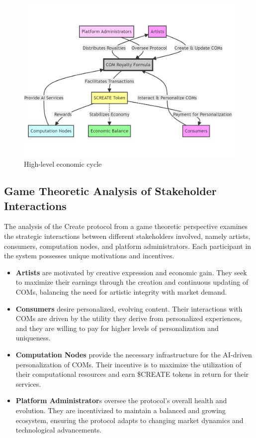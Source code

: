 \documentclass[12pt,a4paper]{article}
\begin{document}
\begin{figure}
    \centering
    \includegraphics[width=0.8\linewidth]{create_3.png}
    \caption{High-level economic cycle}
    \label{fig:economic-cycle}
\end{figure}

\subsection{Game Theoretic Analysis of Stakeholder Interactions}

The analysis of the Create protocol from a game theoretic perspective examines the strategic interactions between different stakeholders involved, namely artists, consumers, computation nodes, and platform administrators. Each participant in the system possesses unique motivations and incentives.

\begin{itemize}
    \item \textbf{Artists} are motivated by creative expression and economic gain. They seek to maximize their earnings through the creation and continuous updating of COMs, balancing the need for artistic integrity with market demand.
    \item \textbf{Consumers} desire personalized, evolving content. Their interactions with COMs are driven by the utility they derive from personalized experiences, and they are willing to pay for higher levels of personalization and uniqueness.
    \item \textbf{Computation Nodes} provide the necessary infrastructure for the AI-driven personalization of COMs. Their incentive is to maximize the utilization of their computational resources and earn \$CREATE tokens in return for their services.
    \item \textbf{Platform Administrator}s oversee the protocol's overall health and evolution. They are incentivized to maintain a balanced and growing ecosystem, ensuring the protocol adapts to changing market dynamics and technological advancements.
\end{itemize}
\end{document}
